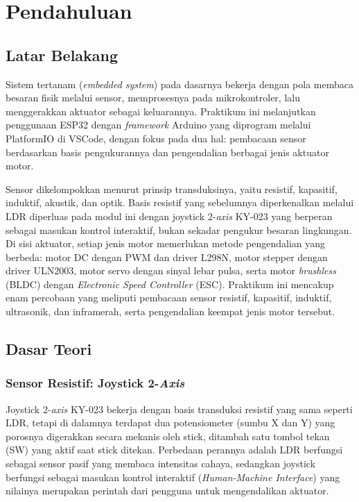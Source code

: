 \section{Pendahuluan}

\subsection{Latar Belakang}
Sistem tertanam (\textit{embedded system}) pada dasarnya bekerja dengan pola
membaca besaran fisik melalui sensor, memprosesnya pada mikrokontroler, lalu
menggerakkan aktuator sebagai keluarannya. Praktikum ini melanjutkan
penggunaan ESP32 dengan \textit{framework} Arduino yang diprogram melalui
PlatformIO di VSCode, dengan fokus pada dua hal:
pembacaan sensor berdasarkan basis pengukurannya dan pengendalian berbagai
jenis aktuator motor.

Sensor dikelompokkan menurut prinsip transduksinya, yaitu resistif, kapasitif,
induktif, akustik, dan optik. Basis resistif yang sebelumnya diperkenalkan
melalui LDR diperluas pada modul ini dengan joystick 2-\textit{axis} KY-023
yang berperan sebagai masukan kontrol interaktif, bukan sekadar pengukur
besaran lingkungan. Di sisi aktuator, setiap jenis motor
memerlukan metode pengendalian yang berbeda: motor DC dengan PWM dan driver
L298N, motor stepper dengan driver ULN2003, motor servo dengan sinyal
lebar pulsa, serta motor \textit{brushless} (BLDC) dengan \textit{Electronic
Speed Controller} (ESC). Praktikum ini mencakup enam percobaan
yang meliputi pembacaan sensor resistif, kapasitif, induktif, ultrasonik, dan
inframerah, serta pengendalian keempat jenis motor tersebut.

\subsection{Dasar Teori}

\subsubsection{Sensor Resistif: Joystick 2-\textit{Axis}}
Joystick 2-\textit{axis} KY-023 bekerja dengan basis transduksi resistif yang
sama seperti LDR, tetapi di dalamnya terdapat dua potensiometer (sumbu X dan Y)
yang porosnya digerakkan secara mekanis oleh stick, ditambah satu tombol tekan
(SW) yang aktif saat stick ditekan. Perbedaan perannya
adalah LDR berfungsi sebagai sensor pasif yang membaca intensitas cahaya,
sedangkan joystick berfungsi sebagai masukan kontrol interaktif
(\textit{Human-Machine Interface}) yang nilainya merupakan perintah dari
pengguna untuk mengendalikan aktuator.

